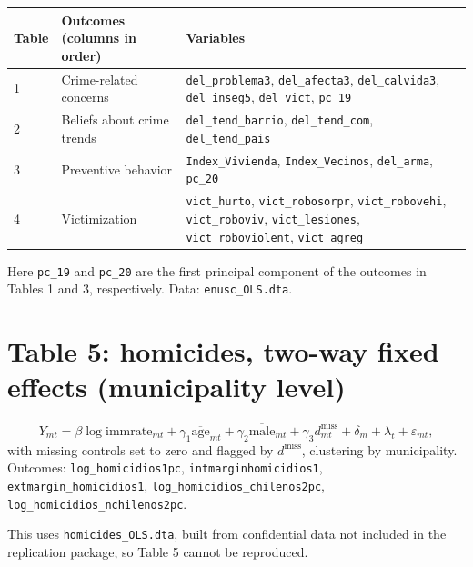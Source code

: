 \documentclass{article}
\newcommand{\answer}[1]{\par\medskip #1\par\medskip}
\begin{document}
\begin{center}
\begin{tabular}{@{}l@{\ \ }p{}p{}@{}}
    Table & Outcomes (columns in order) & Variables\\
    \hline
    1 & Crime-related concerns & \texttt{del\_problema3}, \texttt{del\_afecta3}, \texttt{del\_calvida3}, \texttt{del\_inseg5}, \texttt{del\_vict}, \texttt{pc\_19}\\
    2 & Beliefs about crime trends & \texttt{del\_tend\_barrio}, \texttt{del\_tend\_com}, \texttt{del\_tend\_pais}\\
    3 & Preventive behavior & \texttt{Index\_Vivienda}, \texttt{Index\_Vecinos}, \texttt{del\_arma}, \texttt{pc\_20}\\
    4 & Victimization & \texttt{vict\_hurto}, \texttt{vict\_robosorpr}, \texttt{vict\_robovehi}, \texttt{vict\_roboviv}, \texttt{vict\_lesiones}, \texttt{vict\_roboviolent}, \texttt{vict\_agreg}\\
\end{tabular}
\end{center}
Here \texttt{pc\_19} and \texttt{pc\_20} are the first principal component of the outcomes in Tables 1 and 3, respectively. Data: \texttt{enusc\_OLS.dta}.

\section*{Table 5: homicides, two-way fixed effects (municipality level)}
\begin{equation*}
    Y_{mt} = \beta \log\mathrm{immrate}_{mt} + \gamma_1 \overline{\mathrm{age}}_{mt} + \gamma_2 \overline{\mathrm{male}}_{mt} + \gamma_3 d^{\mathrm{miss}}_{mt} + \delta_m + \lambda_t + \varepsilon_{mt},
\end{equation*}
with missing controls set to zero and flagged by \(d^{\mathrm{miss}}\), clustering by municipality. Outcomes: \texttt{log\_homicidios1pc}, \texttt{intmarginhomicidios1}, \texttt{extmargin\_homicidios1}, \texttt{log\_homicidios\_chilenos2pc}, \texttt{log\_homicidios\_nchilenos2pc}. \answer{This uses \texttt{homicides\_OLS.dta}, built from confidential data not included in the replication package, so Table 5 cannot be reproduced.}
\end{document}
